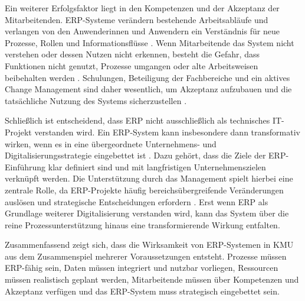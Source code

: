Ein weiterer Erfolgsfaktor liegt in den Kompetenzen und der Akzeptanz der Mitarbeitenden. ERP-Systeme verändern 
bestehende Arbeitsabläufe und verlangen von den Anwenderinnen und Anwendern ein Verständnis für neue Prozesse, 
Rollen und Informationsflüsse \parencite{Alaskari2021,Leyh2015}. Wenn Mitarbeitende das System nicht verstehen oder dessen Nutzen nicht erkennen, 
besteht die Gefahr, dass Funktionen nicht genutzt, Prozesse umgangen oder alte Arbeitsweisen beibehalten werden \parencite{Leyh2015,Leyh2019}. 
Schulungen, Beteiligung der Fachbereiche und ein aktives Change Management sind daher wesentlich, um Akzeptanz 
aufzubauen und die tatsächliche Nutzung des Systems sicherzustellen \parencite{Noudoostbeni2009,Faruque2024}.

Schließlich ist entscheidend, dass ERP nicht ausschließlich als technisches IT-Projekt verstanden wird. Ein 
ERP-System kann insbesondere dann transformativ wirken, wenn es in eine übergeordnete Unternehmens- und 
Digitalisierungsstrategie eingebettet ist \parencite{Leyh2019}. Dazu gehört, dass die Ziele der ERP-Einführung klar definiert sind 
und mit langfristigen Unternehmenszielen verknüpft werden. Die Unterstützung durch das Management spielt hierbei 
eine zentrale Rolle, da ERP-Projekte häufig bereichsübergreifende Veränderungen auslösen und strategische 
Entscheidungen erfordern \parencite{Leyh2015, Barbieri2025}. Erst wenn ERP als Grundlage weiterer Digitalisierung verstanden 
wird, kann das System über die reine Prozessunterstützung hinaus eine transformierende Wirkung entfalten.

Zusammenfassend zeigt sich, dass die Wirksamkeit von ERP-Systemen in KMU aus dem Zusammenspiel mehrerer 
Voraussetzungen entsteht. Prozesse müssen ERP-fähig sein, Daten müssen integriert und nutzbar vorliegen, 
Ressourcen müssen realistisch geplant werden, Mitarbeitende müssen über Kompetenzen und Akzeptanz verfügen 
und das ERP-System muss strategisch eingebettet sein. 
